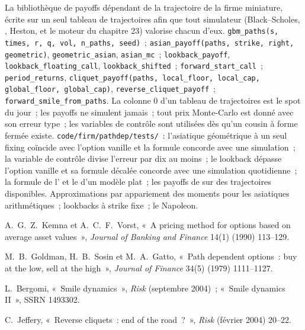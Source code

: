 \begin{build}
 La bibliothèque de payoffs dépendant de la trajectoire de la firme miniature, écrite sur un seul tableau de trajectoires afin que tout
simulateur (Black--Scholes, , Heston, et le moteur du chapitre 23) valorise chacun d'eux.
 \texttt{gbm\_paths(s, times, r, q, vol, n\_paths, seed)}~; \texttt{asian\_payoff(paths, strike, right,
geometric)}, \texttt{geometric\_asian}, \texttt{asian\_mc}~; \texttt{lookback\_payoff}, \texttt{lookback\_floating\_call},
\texttt{lookback\_shifted}~; \texttt{forward\_start\_call}~; \texttt{period\_returns}, \texttt{cliquet\_payoff(paths,
local\_floor, local\_cap, global\_floor, global\_cap)}, \texttt{reverse\_cliquet\_payoff}~; \texttt{forward\_smile\_from\_paths}.
 La colonne 0 d'un tableau de trajectoires est le spot du jour~; les payoffs ne simulent jamais~; tout prix Monte-Carlo est donné avec son
erreur type~; les variables de contrôle sont utilisées dès qu'un cousin à forme fermée existe.
 \texttt{code/firm/pathdep/tests/}~: l'asiatique géométrique à un seul fixing coïncide avec l'option vanille et la formule
concorde avec une simulation~; la variable de contrôle divise l'erreur par dix au moins~; le lookback dépasse l'option vanille et sa
formule décalée concorde avec une simulation quotidienne~; la formule de l' et le  d'un modèle plat~; les payoffs de  sur des trajectoires
disponibles.
 Approximations par appariement des moments pour les asiatiques arithmétiques~; lookbacks à strike fixe~; le Napoleon.
\end{build}

\begin{omsources}
\item A.~G.~Z.~Kemna et A.~C.~F.~Vorst, «~A pricing method for options based on average asset values~», \emph{Journal of
Banking and Finance} 14(1) (1990) 113--129.
\item M.~B.~Goldman, H.~B.~Sosin et M.~A.~Gatto, «~Path dependent options~: buy at the low, sell at the high~»,
\emph{Journal of Finance} 34(5) (1979) 1111--1127.
\item L.~Bergomi, «~Smile dynamics~», \emph{Risk} (septembre 2004)~; «~Smile dynamics II~», SSRN 1493302.
\item C.~Jeffery, «~Reverse cliquets~: end of the road~?~», \emph{Risk} (février 2004) 20--22.
\end{omsources}

